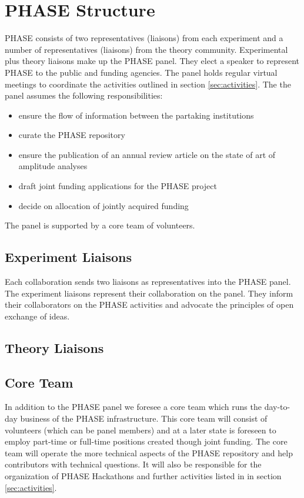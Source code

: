\section{PHASE Structure}
\label{sec:structure}
PHASE consists of two representatives (liaisons) from each experiment and a number of representatives (liaisons) from the theory community. Experimental plus theory liaisons make up the PHASE panel. They elect a speaker to represent PHASE to the public and funding agencies. The panel holds regular virtual meetings to coordinate the activities outlined in section \ref{sec:activities}. The the panel assumes the following responsibilities:
\begin{itemize}
\item ensure the flow of information between the partaking institutions
\item curate the PHASE repository
\item ensure the publication of an annual review article on the state of art of amplitude analyses
\item draft joint funding applications for the PHASE project
\item decide on allocation of jointly acquired funding
\end{itemize}

The panel is supported by a core team of volunteers.




\subsection{Experiment Liaisons}
Each collaboration sends two liaisons as representatives into the PHASE panel. The experiment liaisons represent their collaboration on the panel. They inform their collaborators on the PHASE activities and advocate the principles of open exchange of ideas. 

\subsection{Theory Liaisons}



\subsection{Core Team}

In addition to the PHASE panel we foresee a core team which runs the day-to-day business of the PHASE infrastructure. This core team will consist of volunteers (which can be panel members) and at a later state is foreseen to employ part-time or full-time positions created though joint funding. The core team will operate the more technical aspects of the PHASE repository and help contributors with technical questions. It will also be responsible for the organization of PHASE Hackathons and further activities listed in in section \ref{sec:activities}.

